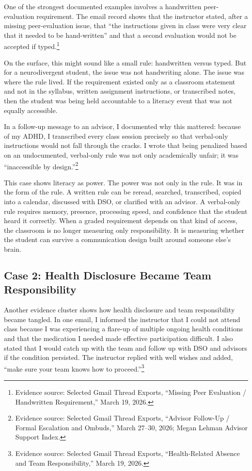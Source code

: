 \documentclass[12pt]{article}
\begin{document}
One of the strongest documented examples involves a handwritten peer-evaluation requirement. The email record shows that the instructor stated, after a missing peer-evaluation issue, that ``the instructions given in class were very clear that it needed to be hand-written'' and that a second evaluation would not be accepted if typed.\footnote{Evidence source: Selected Gmail Thread Exports, ``Missing Peer Evaluation / Handwritten Requirement,'' March 19, 2026.}

On the surface, this might sound like a small rule: handwritten versus typed. But for a neurodivergent student, the issue was not handwriting alone. The issue was where the rule lived. If the requirement existed only as a classroom statement and not in the syllabus, written assignment instructions, or transcribed notes, then the student was being held accountable to a literacy event that was not equally accessible.

In a follow-up message to an advisor, I documented why this mattered: because of my ADHD, I transcribed every class session precisely so that verbal-only instructions would not fall through the cracks. I wrote that being penalized based on an undocumented, verbal-only rule was not only academically unfair; it was ``inaccessible by design.''\footnote{Evidence source: Selected Gmail Thread Exports, ``Advisor Follow-Up / Formal Escalation and Ombuds,'' March 27--30, 2026; Megan Lehman Advisor Support Index.}

This case shows literacy as power. The power was not only in the rule. It was in the form of the rule. A written rule can be reread, searched, transcribed, copied into a calendar, discussed with DSO, or clarified with an advisor. A verbal-only rule requires memory, presence, processing speed, and confidence that the student heard it correctly. When a graded requirement depends on that kind of access, the classroom is no longer measuring only responsibility. It is measuring whether the student can survive a communication design built around someone else's brain.

\subsection*{Case 2: Health Disclosure Became Team Responsibility}

Another evidence cluster shows how health disclosure and team responsibility became tangled. In one email, I informed the instructor that I could not attend class because I was experiencing a flare-up of multiple ongoing health conditions and that the medication I needed made effective participation difficult. I also stated that I would catch up with the team and follow up with DSO and advisors if the condition persisted. The instructor replied with well wishes and added, ``make sure your team knows how to proceed.''\footnote{Evidence source: Selected Gmail Thread Exports, ``Health-Related Absence and Team Responsibility,'' March 19, 2026.}
\end{document}
